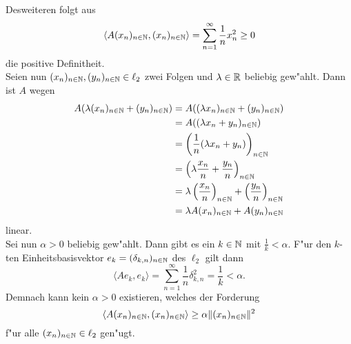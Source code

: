 \begin{itemize}
Desweiteren folgt aus
\[
\langle A(x_n)_{n\in\mathbb{N}}, (x_n)_{n\in\mathbb{N}} \rangle = \sum_{n=1}^\infty \frac{1}{n}x_n^2 \ge 0
\]
die positive Definitheit. \\

Seien nun $(x_n)_{n\in\mathbb{N}}, (y_n)_{n\in\mathbb{N}}\in\ell_2$ zwei Folgen und $\lambda\in\mathbb{R}$ beliebig gew"ahlt.
Dann ist $A$ wegen
\begin{align*}
A(\lambda(x_n)_{n\in\mathbb{N}}+(y_n)_{n\in\mathbb{N}}) &= A((\lambda x_n)_{n\in\mathbb{N}} + (y_n)_{n\in\mathbb{N}})\\
&= A((\lambda x_n + y_n)_{n\in\mathbb{N}})\\
&= \left(\frac{1}{n} (\lambda x_n + y_n) \right)_{n\in\mathbb{N}}\\
&= \left( \lambda\frac{x_n}{n} + \frac{y_n}{n}\right)_{n\in\mathbb{N}}\\
&= \lambda\left(\frac{x_n}{n}\right)_{n\in\mathbb{N}} + \left(\frac{y_n}{n}\right)_{n\in\mathbb{N}}\\
&= \lambda A(x_n)_{n\in\mathbb{N}} + A(y_n)_{n\in\mathbb{N}}
\end{align*}
linear.\\

Sei nun $\alpha > 0$ beliebig gew"ahlt. Dann gibt es ein $k\in\mathbb{N}$ mit $\frac{1}{k}<\alpha$.
F"ur den $k$-ten Einheitsbasisvektor $e_k=(\delta_{k,n})_{n\in\mathbb{N}}$ des $\ell_2$ gilt dann
\begin{displaymath}
 \langle Ae_k,e_k\rangle=\sum_{n=1}^\infty \frac{1}{n}\delta_{k,n}^2=\frac{1}{k}<\alpha.
\end{displaymath}
Demnach kann kein $\alpha > 0$ existieren, welches der Forderung
\[
\langle A(x_n)_{n\in\mathbb{N}},(x_n)_{n\in\mathbb{N}}\rangle \ge \alpha\lVert (x_n)_{n\in\mathbb{N}} \rVert^2
\]
f"ur alle $(x_n)_{n\in\mathbb{N}}\in\ell_2$ gen"ugt.

\end{itemize}
